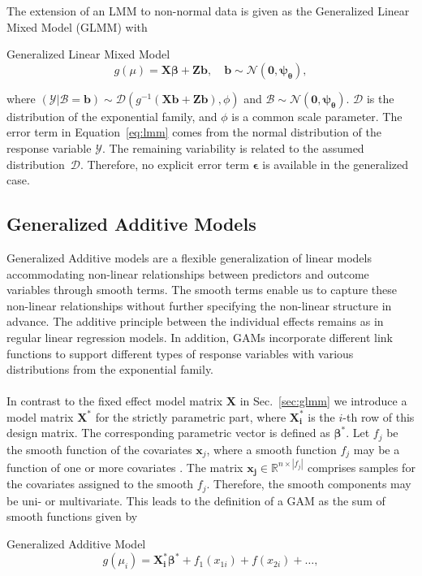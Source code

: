The extension of an LMM to non-normal data is given as the Generalized Linear Mixed Model (GLMM) with
\begin{defi}Generalized Linear Mixed Model
    \begin{equation}\label{eq:glmm}
        g({\mu}) =  \mathbf{X}\bm{\beta} + \mathbf{Z}\bm{b}, \quad \bm{b}\sim \mathcal{N}(\bm{0}, \bm{\psi_{\theta}}),
    \end{equation}
\end{defi}
where $(\mathcal{Y} | \mathcal{B} = \bm{b}) \sim \mathcal{D}(g^{-1}(\mathbf{X}\bm{b} + \mathbf{Z}\bm{b}), \phi)$ and $\mathcal{B} \sim \mathcal{N}(\bm{0}, \bm{\psi_{\theta}})$. $\mathcal{D}$ is the distribution of the exponential family, and $\phi$ is a common scale parameter. The error term in Equation~\ref{eq:lmm} comes from the normal distribution of the response variable $\mathcal{Y}$. The remaining variability is related to the assumed distribution~$\mathcal{D}$. Therefore, no explicit error term $\bm{\epsilon}$ is available in the generalized case.

\subsection{Generalized Additive Models}
Generalized Additive models are a flexible generalization of linear models accommodating non-linear relationships between predictors and outcome variables through smooth terms. The smooth terms enable us to capture these non-linear relationships without further specifying the non-linear structure in advance. The additive principle between the individual effects remains as in regular linear regression models. In addition, GAMs incorporate different link functions to support different types of response variables with various distributions from the exponential family. 
\\
\\
In contrast to the fixed effect model matrix $\mathbf{X}$ in Sec.~\ref{sec:glmm} we introduce a model matrix $\mathbf{X^*}$ for the strictly parametric part, where $\mathbf{X^*_i}$ is the $i$-th row of this design matrix. The corresponding parametric vector is defined as $\bm{\beta^*}$. Let $f_j$ be the smooth function of the covariates $\bm{x}_j$, where a smooth function $f_j$ may be a function of one or more covariates \citep{wood_generalized_2017, wood_stable_2004}. The matrix $\mathbf{x_j} \in \mathbb{R}^{n \times |f_j|}$ comprises samples for the covariates assigned to the smooth $f_j$. Therefore, the smooth components may be uni- or multivariate. This leads to the definition of a GAM as the sum of smooth functions given by 
\begin{defi}Generalized Additive Model
    \begin{equation}\label{eq:gam}
    g(\mu_i) = \mathbf{X_i^*}\bm{\beta^*} + f_1(x_{1i}) + f(x_{2i}) + \dots,
    \end{equation}
\end{defi}

